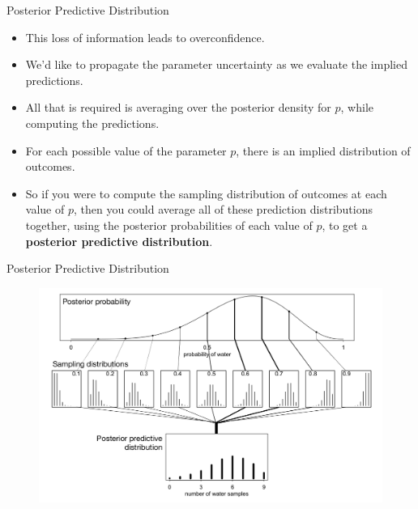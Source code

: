 \documentclass[handout]{beamer}
\begin{document}
\begin{frame}{Posterior Predictive Distribution}
\scriptsize{

\begin{itemize}

\item This loss of information leads to overconfidence.

\item  We'd like to propagate the parameter uncertainty as we evaluate the
implied predictions.

\item All that is required is averaging over the posterior density for $p$, while computing the predictions.

\item For each possible value of the parameter $p$, there is an implied
distribution of outcomes.

\item So if you were to compute the sampling distribution of outcomes at each value of $p$, then you could average all of these prediction distributions together, using the posterior probabilities of each value of $p$, to get a \textbf{posterior predictive distribution}.
\end{itemize}


} 
\end{frame}


\begin{frame}{Posterior Predictive Distribution}

   \begin{figure}[h!]
	\centering
	\includegraphics[scale=0.31]{pics/posterior_predictive.png}
	\end{figure} 

\end{frame}
\end{document}

